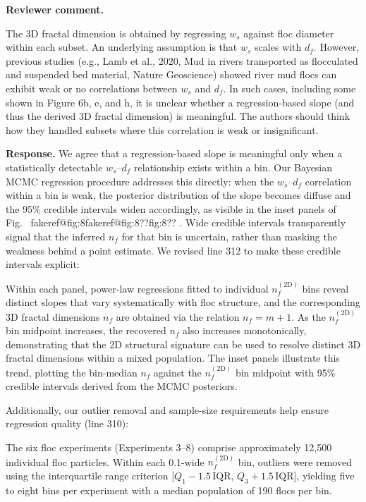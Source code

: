 \documentclass[11pt]{article}
\makeatletter
\newenvironment{Snippet}{%
  \par\vspace{0.3em}\begin{list}{}{\setlength{\leftmargin}{1em}\setlength{\rightmargin}{0.5em}}\item\small\itshape
}{%
  \end{list}\vspace{0.3em}
}
\newcommand{\fakeref}[1]{%
  \ifcsname fakeref@#1\endcsname\csname fakeref@#1\endcsname\else ??#1??\fi
}
\renewcommand{\ref}[1]{\fakeref{#1}}%
\makeatother
\begin{document}
\begin{enumerate}[label=\textbf{R3.\arabic*.}]
\item \textbf{Reviewer comment.}
\begin{Snippet}
The 3D fractal dimension is obtained by regressing $w_s$ against floc diameter within each subset. An underlying assumption is that $w_s$ scales with $d_f$. However, previous studies (e.g., Lamb et al., 2020, Mud in rivers transported as flocculated and suspended bed material, Nature Geoscience) showed river mud flocs can exhibit weak or no correlations between $w_s$ and $d_f$. In such cases, including some shown in Figure 6b, e, and h, it is unclear whether a regression-based slope (and thus the derived 3D fractal dimension) is meaningful. The authors should think how they handled subsets where this correlation is weak or insignificant.
\end{Snippet}
\textbf{Response.}
We agree that a regression-based slope is meaningful only when a statistically detectable $w_s$--$d_f$ relationship exists within a bin. Our Bayesian MCMC regression procedure addresses this directly: when the $w_s$--$d_f$ correlation within a bin is weak, the posterior distribution of the slope becomes diffuse and the 95\% credible intervals widen accordingly, as visible in the inset panels of Fig.~\ref{fig:8}. Wide credible intervals transparently signal that the inferred $n_f$ for that bin is uncertain, rather than masking the weakness behind a point estimate. We revised line 312 to make these credible intervals explicit:
\begin{Snippet}
Within each panel, power-law regressions fitted to individual $n_f^{(\mathrm{2D})}$ bins reveal distinct slopes that vary systematically with floc structure, and the corresponding 3D fractal dimensions $n_f$ are obtained via the relation $n_f = m + 1$. As the $n_f^{(\mathrm{2D})}$ bin midpoint increases, the recovered $n_f$ also increases monotonically, demonstrating that the 2D structural signature can be used to resolve distinct 3D fractal dimensions within a mixed population. The inset panels illustrate this trend, plotting the bin-median $n_f$ against the $n_f^{(\mathrm{2D})}$ bin midpoint with 95\% credible intervals derived from the MCMC posteriors.
\end{Snippet}
Additionally, our outlier removal and sample-size requirements help ensure regression quality (line 310):
\begin{Snippet}
The six floc experiments (Experiments 3--8) comprise approximately 12{,}500 individual floc particles. Within each 0.1-wide $n_f^{(\mathrm{2D})}$ bin, outliers were removed using the interquartile range criterion [$Q_1 - 1.5\,\mathrm{IQR},\, Q_3 + 1.5\,\mathrm{IQR}$], yielding five to eight bins per experiment with a median population of 190 flocs per bin.

\end{Snippet}
\end{enumerate}
\end{document}
